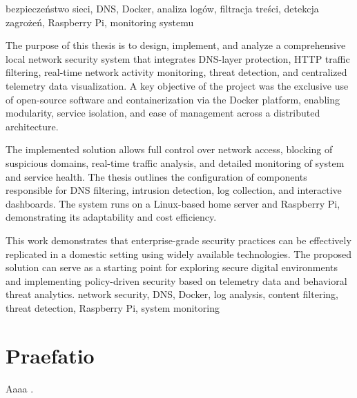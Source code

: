 \documentclass[
    left=2.5cm,         %
    right=2.5cm,        %
    top=2.5cm,          %
    bottom=3cm,         %
    bindingoffset=6mm,  %
    nohyphenation=true %
]{eiti/eiti-thesis} %
\begin{document}
\slowakluczowe bezpieczeństwo sieci, DNS, Docker, analiza logów, filtracja treści, detekcja zagrożeń, Raspberry Pi, monitoring systemu

\newpage

\abstract The purpose of this thesis is to design, implement, and analyze a comprehensive local network security system that integrates DNS-layer protection, HTTP traffic filtering, real-time network activity monitoring, threat detection, and centralized telemetry data visualization. A key objective of the project was the exclusive use of open-source software and containerization via the Docker platform, enabling modularity, service isolation, and ease of management across a distributed architecture.

The implemented solution allows full control over network access, blocking of suspicious domains, real-time traffic analysis, and detailed monitoring of system and service health. The thesis outlines the configuration of components responsible for DNS filtering, intrusion detection, log collection, and interactive dashboards. The system runs on a Linux-based home server and Raspberry Pi, demonstrating its adaptability and cost efficiency.

This work demonstrates that enterprise-grade security practices can be effectively replicated in a domestic setting using widely available technologies. The proposed solution can serve as a starting point for exploring secure digital environments and implementing policy-driven security based on telemetry data and behavioral threat analytics.
\keywords network security, DNS, Docker, log analysis, content filtering, threat detection, Raspberry Pi, system monitoring
\newpage


\thispagestyle{empty}
\tableofcontents

\newpage 
\section{Praefatio}
\lipsum[1-2] Aaaa \cite{goossens93}.
\end{document}
